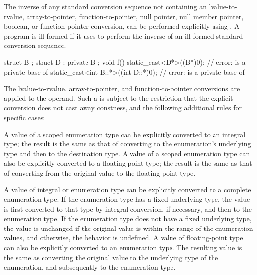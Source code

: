 \pnum
The inverse of any standard conversion sequence not containing an
lvalue-to-rvalue,
array-to-pointer,
function-to-pointer,
null pointer, null member pointer,
boolean, or
function pointer
conversion, can be performed explicitly using . A
program is ill-formed if it uses  to perform the
inverse of an ill-formed standard conversion sequence.
\begin{example}
\begin{codeblock}
struct B { };
struct D : private B { };
void f() {
  static_cast<D*>((B*)0);               // error:  is a private base of 
  static_cast<int B::*>((int D::*)0);   // error:  is a private base of 
}
\end{codeblock}
\end{example}

\pnum
The lvalue-to-rvalue,
array-to-pointer, and
function-to-pointer conversions are applied to the
operand. Such a  is subject to the restriction that
the explicit conversion does not cast away
constness, and the following additional rules
for specific cases:

\pnum
A value of a scoped enumeration type
can be explicitly converted to an integral type;
the result is the same as that of converting
to the enumeration's underlying type and then to the destination type.
A value of a scoped enumeration type
can also be explicitly converted to a floating-point type;
the result is the same as that of converting
from the original value to the floating-point type.

\pnum
{}%
%
A value of integral or enumeration type can be explicitly converted to
a complete enumeration type.
If the enumeration type has a fixed underlying type,
the value is first converted to that type
by integral conversion, if necessary, and
then to the enumeration type.
If the enumeration type does not have a fixed underlying type,
the value is unchanged
if the original value is within the range
of the enumeration values, and
otherwise, the behavior is undefined.
A value of floating-point type can also be explicitly converted to an enumeration type.
The resulting value is the same as converting the original value to the
underlying type of the enumeration, and subsequently to
the enumeration type.

